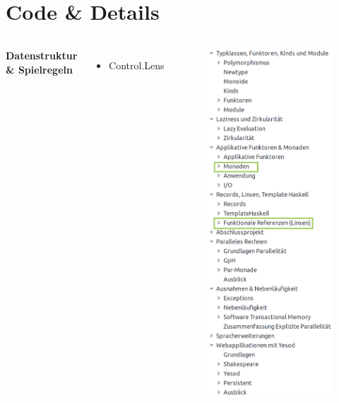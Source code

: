 \documentclass{beamer}
\begin{document}

\section{Code \& Details}


\begin{frame}

\begin{columns}

{\Large \textbf{Datenstruktur \& Spielregeln}}

\begin{itemize}
    \item Control.Lens
\end{itemize}

\begin{figure}
\includegraphics[height=0.9\paperheight]{cont/sschessdata.png}

\end{figure}
\end{columns}
\end{frame}
\end{document}
